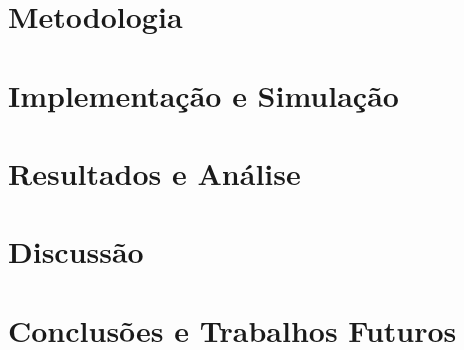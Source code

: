 \documentclass[12pt,oneside,a4paper,english,brazilian]{report}
\begin{document}
\newpage
\chapter{Metodologia}


\newpage
\chapter{Implementação e Simulação}


\newpage
\chapter{Resultados e Análise}


\newpage
\chapter{Discussão}


\newpage
\chapter{Conclusões e Trabalhos Futuros}


\newpage
\printbibliography[title=Referências Bibliográficas]

\newpage
\appendix

\end{document}
